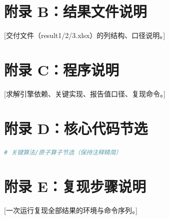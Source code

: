 \section*{附录 B：结果文件说明}
[交付文件（result1/2/3.xlsx）的列结构、口径说明。]

\section*{附录 C：程序说明}
[求解引擎依赖、关键实现、报告值口径、复现命令。]

\section*{附录 D：核心代码节选}
\begin{lstlisting}[language=Python]
# 关键算法/原子算子节选（保持注释精简）
\end{lstlisting}

\section*{附录 E：复现步骤说明}
[一次运行复现全部结果的环境与命令序列。]
